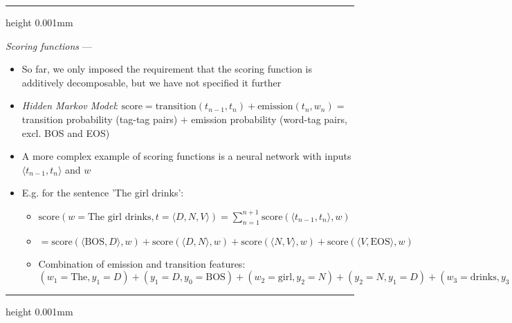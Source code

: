 {\color{lightgrey}\hrule height 0.001mm}

\emph{Scoring functions} --- 
\begin{itemize}
    \item So far, we only imposed the requirement that the scoring function is additively decomposable, but we have not specified it further
    \item \emph{Hidden Markov Model}:
    $
    \textrm{score} = \textrm{transition}(t_{n-1}, t_n) + \textrm{emission}(t_n, w_n) =
    $ transition probability (tag-tag pairs) $+$ emission probability (word-tag pairs, excl. BOS and EOS)
    \item A more complex example of scoring functions is a neural network with inputs $\langle t_{n-1}, t_n \rangle$ and $w$
    \item E.g. for the sentence 'The girl drinks':
    \begin{itemize}
        \item $\textrm{score}(w = \textrm{The girl drinks}, t = \langle D, N, V \rangle) = \sum_{n=1}^{n+1} \textrm{score}(\langle t_{n-1}, t_n \rangle, w)$
        \item $= \textrm{score}(\langle \textrm{BOS}, D \rangle, w) + \textrm{score}(\langle D, N \rangle, w) + \textrm{score}(\langle N, V \rangle, w) + \textrm{score}(\langle V, \textrm{EOS} \rangle, w)$
        \item Combination of emission and transition features: $(w_1 = \textrm{The}, y_1 = D) + (y_1 = D, y_0 = \textrm{BOS}) + (w_2 = \textrm{girl}, y_2 = N) + (y_2 = N, y_1 = D) + (w_3 = \textrm{drinks}, y_3 = V) + (y_3 = V, y_2 = N) + (y_4 = \textrm{EOS}, y_3 = V)$
    \end{itemize}
\end{itemize}

{\color{black}\hrule height 0.001mm}

